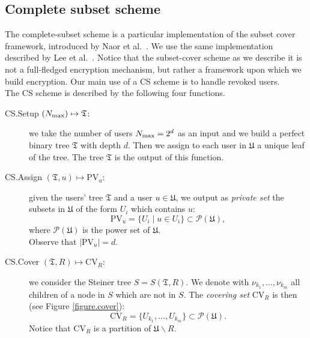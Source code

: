 \documentclass[a4paper,10pt]{article}
\newcommand{\tree}{\mathfrak{T}}
\newcommand{\mapssingleoutput}[2]{$ \left( #1 \right) \mapsto #2 $}
\newcommand{\algorithmdefsingleoutput}[4]{\item[#1.#2 \mapssingleoutput{#3}{#4}:] }
\newcommand{\CV}{\mathrm{CV}}
\newcommand{\PV}{\mathrm{PV}}
\renewcommand{\setminus}{\smallsetminus}
\begin{document}
	\subsection{Complete subset scheme}
	\label{cs.sec}
	The complete-subset scheme is a particular implementation of the subset cover framework, introduced by Naor et al.~\cite{naor2001SC}. We use the same implementation described by Lee et al.~\cite{lee2013RSABE}.
	Notice that the subset-cover scheme as we describe it is not a full-fledged encryption mechanism, but rather a framework upon which we build encryption. Our main use of a CS scheme is to handle revoked users.\\
	The CS scheme is described by the following four functions.
	\begin{description}
	\algorithmdefsingleoutput{CS}{Setup}{N_{\textnormal{max}}}{\tree{}} we take the number of users $N_{\textnormal{max}}=2^d$ as an input and we build a perfect binary tree $\tree$ with depth $d$.
		Then we assign to each user in $\mathfrak{U}$ a unique leaf of the tree. The tree $\tree{}$ is the output of this function.

		\algorithmdefsingleoutput{CS}{Assign}{\tree{},u}{\PV_{u}} given the users' tree $\tree{}$ and a user $u\in \mathfrak{U}$, we output as \emph{private set} the subsets in $\mathfrak{U}$ of the form $U_i$ which contains $u$:
		\[
			\PV_u=\{U_i \mid u\in U_i\}\subset\mathcal{P}(\mathfrak{U}),
		\]
		where $\mathcal{P}(\mathfrak{U})$ is the power set of $\mathfrak{U}$.\\
		Observe that $|\PV_u|=d$.


		\algorithmdefsingleoutput{CS}{Cover}{\tree{},R}{\CV_{R}} we consider the Steiner tree $S=S(\tree{},R)$. We denote with $\nu_{k_1},\ldots,\nu_{k_m}$ all children of a node in $S$ which are not in $S$. The \emph{covering set} $\CV_R$ is then (see Figure \ref{figure.cover}):
		\[
			\CV_R=\{U_{k_1},\ldots,U_{k_m}\}\subset\mathcal{P}(\mathfrak{U}).
		\]
		Notice that $\CV_R$  is a partition of $\mathfrak{U}\setminus R$.
		

\end{description}
\end{document}
